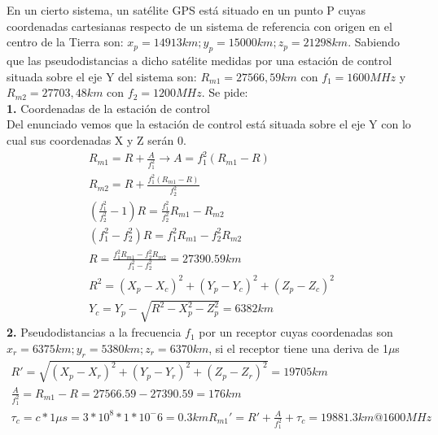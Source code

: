 \begin{exercise}[3]
	En un cierto sistema, un satélite GPS está situado en un punto P cuyas coordenadas cartesianas respecto de un sistema de referencia con origen en el centro de la Tierra son: $x_p=14913km;y_p=15000km;z_p=21298km$. Sabiendo que las pseudodistancias a dicho satélite medidas por una estación de control situada sobre el eje Y del sistema son: $R_{m1}=27566,59km$ con $f_1=1600MHz$ y $R_{m2}=27703,48km$ con $f_2=1200MHz$. Se pide:\\
	\textbf{1.} Coordenadas de la estación de control \\
	Del enunciado vemos que la estación de control está situada sobre el eje Y con lo cual sus coordenadas X y Z serán 0.
	\begin{gather*}
		R_{m1}=R+\frac{A}{f_1^2}\to A=f_1^2(R_{m1}-R)\\
		R_{m2}=R+\frac{f_1^2(R_{m1}-R)}{f_2^2}\\
		(\frac{f_1^2}{f_2^2}-1)R=\frac{f_1^2}{f_2^2}R_{m1}-R_{m2}\\
		(f_1^2-f_2^2)R=f_1^2R_{m1}-f_2^2R_{m2}\\
		R=\frac{f_1^2R_{m1}-f_2^2R_{m2}}{f_1^2-f_2^2}=27390.59km\\
		R^2=(X_p-X_c)^2+(Y_p-Y_c)^2+(Z_p-Z_c)^2\\
		Y_c=Y_p-\sqrt{R^2-X_p^2-Z_p^2}=6382km
	\end{gather*}
	\textbf{2.} Pseudodistancias a la frecuencia $f_1$ por un receptor cuyas coordenadas son $x_r=6375km;y_r=5380km;z_r=6370km$, si el receptor tiene una deriva de 1$\mu$s\\
	\begin{gather*}
		R'=\sqrt{(X_p-X_r)^2+(Y_p-Y_r)^2+(Z_p-Z_r)^2}=19705km\\
		\frac{A}{f_1^2}=R_{m1}-R=27566.59-27390.59=176km\\
		\tau_c=c*1\mu s=3*10^8*1*10^-6=0.3km
		R_{m1}'=R'+\frac{A}{f_1^2}+\tau_c=19881.3km@1600MHz
	\end{gather*}
\end{exercise}
